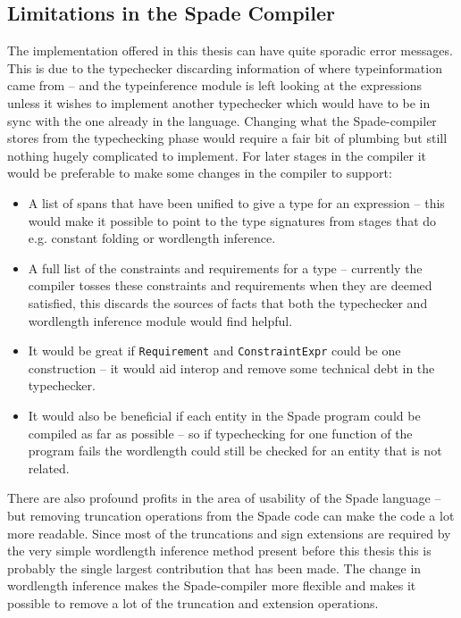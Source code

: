 \subsection{Limitations in the Spade Compiler}
The implementation offered in this thesis can have quite sporadic error messages. This is due to the typechecker discarding information of where typeinformation came from -- and the typeinference module is left looking at the expressions unless it wishes to implement another typechecker which would have to be in sync with the one already in the language. Changing what the Spade-compiler stores from the typechecking phase would require a fair bit of plumbing but still nothing hugely complicated to implement. For later stages in the compiler it would be preferable to make some changes in the compiler to support:
\begin{itemize}
  \item A list of spans that have been unified to give a type for an expression -- this would make it possible to point to the type signatures from stages that do e.g. constant folding or wordlength inference.
  \item A full list of the constraints and requirements for a type -- currently the compiler tosses these constraints and requirements when they are deemed satisfied, this discards the sources of facts that both the typechecker and wordlength inference module would find helpful.
  \item It would be great if \verb+Requirement+ and \verb+ConstraintExpr+ could be one construction -- it would aid interop and remove some technical debt in the typechecker.
  \item It would also be beneficial if each entity in the Spade program could be compiled as far as possible -- so if typechecking for one function of the program fails the wordlength could still be checked for an entity that is not related.
\end{itemize}

There are also profound profits in the area of usability of the Spade language -- but removing truncation operations from the Spade code can make the code a lot more readable. Since most of the truncations and sign extensions are required by the very simple wordlength inference method present before this thesis this is probably the single largest contribution that has been made. The change in wordlength inference makes the Spade-compiler more flexible and makes it possible to remove a lot of the truncation and extension operations.


